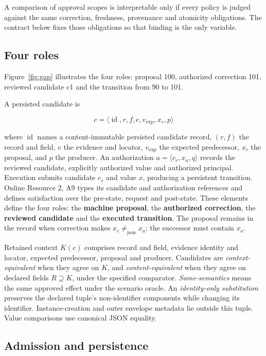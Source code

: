 \documentclass[pdflatex,sn-basic]{sn-jnl}
\begin{document}
A comparison of approval scopes is interpretable only if every policy is judged against the same correction, freshness, provenance and atomicity obligations. The contract below fixes those obligations so that binding is the only variable.

\subsection{Four roles}\label{four-roles}

Figure~\ref{fig:gap} illustrates the four roles: proposal 100, authorized correction 101, reviewed candidate c1 and the transition from 90 to 101.

A persisted candidate is

\[
c = \langle \operatorname{id}, r, f, e, v_{\mathrm{exp}}, x_c, p\rangle
\]

where \(\operatorname{id}\) names a content-immutable persisted candidate record, \((r,f)\) the record and field, \(e\) the evidence and locator, \(v_{\mathrm{exp}}\) the expected predecessor, \(x_c\) the proposal, and \(p\) the producer. An authorization \(a = \langle c_r, x_a, q\rangle\) records the reviewed candidate, explicitly authorized value and authorized principal. Execution submits candidate \(c_s\) and value \(x\), producing a persistent transition. Online Resource 2, A9 types its candidate and authorization references and defines satisfaction over the pre-state, request and post-state. These elements define the four roles: the \textbf{machine proposal}, the \textbf{authorized correction}, the \textbf{reviewed candidate} and the \textbf{executed transition}. The proposal remains in the record when correction makes \(x_c \ne _{\mathrm{json}} x_a\); the successor must contain \(x_a\).

Retained context \(K(c)\) comprises record and field, evidence identity and locator, expected predecessor, proposal and producer. Candidates are \emph{context-equivalent} when they agree on \(K\), and \emph{content-equivalent} when they agree on declared fields \(R\supseteq K\), under the specified comparator. \emph{Same-semantics} means the same approved effect under the scenario oracle. An \emph{identity-only substitution} preserves the declared tuple's non-identifier components while changing its identifier. Instance-creation and outer envelope metadata lie outside this tuple. Value comparisons use canonical JSON equality.

\subsection{Admission and persistence}\label{admission-and-persistence}
\end{document}
